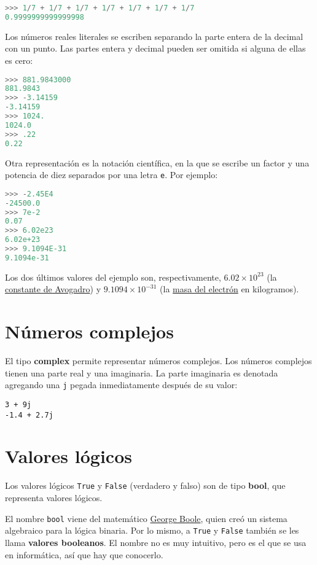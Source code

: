 \begin{lstlisting}[language=py]
>>> 1/7 + 1/7 + 1/7 + 1/7 + 1/7 + 1/7 + 1/7
0.9999999999999998
\end{lstlisting}

Los números reales literales se escriben separando la parte entera de la
decimal con un punto. Las partes entera y decimal pueden ser omitida si
alguna de ellas es cero:

\begin{lstlisting}[language=py]
>>> 881.9843000
881.9843
>>> -3.14159
-3.14159
>>> 1024.
1024.0
>>> .22
0.22
\end{lstlisting}

Otra representación es la notación científica, en la que se escribe un
factor y una potencia de diez separados por una letra \lstinline!e!. Por
ejemplo:

\begin{lstlisting}[language=py]
>>> -2.45E4
-24500.0
>>> 7e-2
0.07
>>> 6.02e23
6.02e+23
>>> 9.1094E-31
9.1094e-31
\end{lstlisting}

Los dos últimos valores del ejemplo son, respectivamente,
$6.02\times 10^{23}$
(la \href{http://es.wikipedia.org/wiki/Constante\_de\_Avogadro}{constante de Avogadro}) y
$9.1094\times 10^{-31}$
(la \href{http://es.wikipedia.org/wiki/Electr\%C3\%B3n\#Propiedades}{masa del electrón} en kilogramos).

\section{Números complejos}

El tipo \textbf{complex} permite representar números complejos.
Los números complejos tienen una parte real y una imaginaria. La parte
imaginaria es denotada agregando una \lstinline!j! pegada inmediatamente
después de su valor:

\begin{lstlisting}
3 + 9j
-1.4 + 2.7j
\end{lstlisting}

\section{Valores lógicos}

Los valores lógicos \lstinline!True! y \lstinline!False! (verdadero y
falso) son de tipo \textbf{bool}, que representa valores lógicos.

El nombre \lstinline!bool! viene del matemático
\href{http://es.wikipedia.org/wiki/George\_Boole}{George Boole}, quien
creó un sistema algebraico para la lógica binaria. Por lo mismo, a
\lstinline!True! y \lstinline!False! también se les llama
\textbf{valores booleanos}. El nombre no es muy intuitivo, pero es el
que se usa en informática, así que hay que conocerlo.

